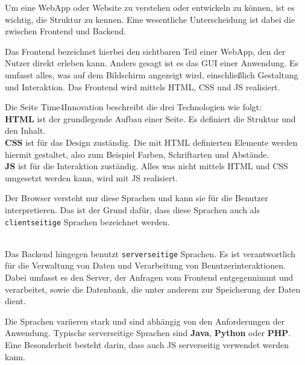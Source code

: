 \documentclass[biblatex]{lni}
\begin{document}
Um eine \ac{WebApp} oder Website zu verstehen oder entwickeln zu können, ist es wichtig, die Struktur zu kennen.
Eine wesentliche Unterscheidung ist dabei die zwischen Frontend und Backend.

Das Frontend bezeichnet hierbei den sichtbaren Teil einer \ac{WebApp}, den der Nutzer direkt erleben kann. \cite{CMSRev}
Anders gesagt ist es das \ac{GUI} einer Anwendung.
Es umfasst alles, was auf dem Bildschirm angezeigt wird, einschließlich Gestaltung und Interaktion.
Das Frontend wird mittels \ac{HTML}, \ac{CSS} und \ac{JS} realisiert.

Die Seite Time4Innovation \cite{T4I} beschreibt die drei Technologien wie folgt: \\
\textbf{\ac{HTML}} ist der grundlegende Aufbau einer Seite.
Es definiert die Struktur und den Inhalt. \\
\textbf{\ac{CSS}} ist für das Design zuständig.
Die mit \ac{HTML} definierten Elemente werden hiermit gestaltet, also zum Beispiel Farben, Schriftarten und Abstände. \\
\textbf{\ac{JS}} ist für die Interaktion zuständig.
Alles was nicht mittels \ac{HTML} und \ac{CSS} umgesetzt werden kann, wird mit \ac{JS} realisiert.

Der Browser versteht nur diese Sprachen und kann sie für die Benutzer interpretieren. \cite{CoU}
Das ist der Grund dafür, dass diese Sprachen auch als \texttt{clientseitige} Sprachen bezeichnet werden.

\\

Das Backend hingegen benutzt \texttt{serverseitige} Sprachen. \cite{CMSRev}
Es ist verantwortlich für die Verwaltung von Daten und Verarbeitung von Benutzerinteraktionen.
Dabei umfasst es den Server, der Anfragen vom Frontend entgegennimmt und verarbeitet,
sowie die Datenbank, die unter anderem zur Speicherung der Daten dient.

Die Sprachen variieren stark und sind abhängig von den Anforderungen der Anwendung.
Typische serverseitige Sprachen sind \textbf{Java}, \textbf{Python} oder \textbf{PHP}.
Eine Besonderheit besteht darin, dass auch \ac{JS} serverseitig verwendet werden kann.

\\
\end{document}
